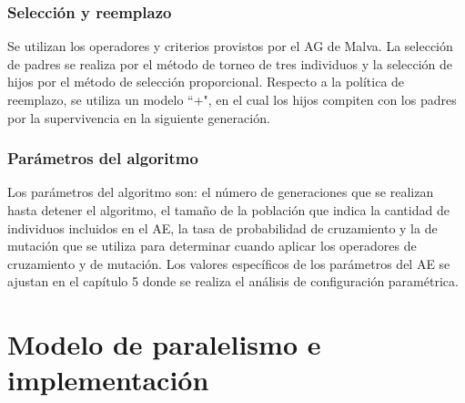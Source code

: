 \subsubsection{Selección y reemplazo}
Se utilizan los operadores y criterios provistos por el AG de Malva. La selección de padres se realiza por el método de torneo de tres individuos y la selección de hijos por el método de selección proporcional. Respecto a la política de reemplazo, se utiliza un modelo ``+", en el cual los hijos compiten con los padres por la supervivencia en la siguiente generación.

\subsubsection{Parámetros del algoritmo}
Los parámetros del algoritmo son: el número de generaciones que se realizan hasta detener el algoritmo, el tamaño de la población que indica la cantidad de individuos incluidos en el AE, la tasa de probabilidad de cruzamiento y la de mutación que se utiliza para determinar cuando aplicar los operadores de cruzamiento y de mutación. Los valores específicos de los parámetros del AE se ajustan en el capítulo 5 donde se realiza el análisis de configuración paramétrica. 

\section{Modelo de paralelismo e implementación}





